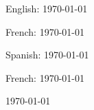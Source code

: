 \documentclass{article}
\begin{document}
English: \today

French: \today

Spanish: \today

\begin{otherlanguage}{french}
French: \today
\end{otherlanguage}

\today
\end{document}
